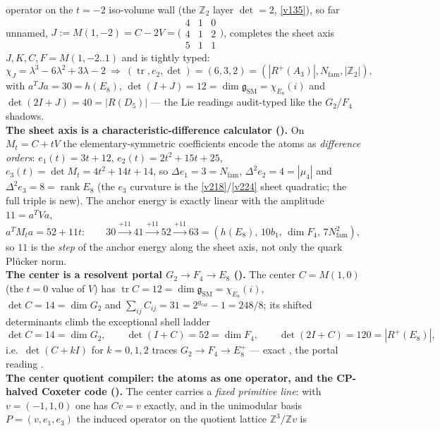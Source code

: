 \documentclass[11pt,a4paper]{article}
\newcommand{\gcar}{g_{\mathrm{car}}}
\newcommand{\Nfam}{N_{\mathrm{fam}}}
\newcommand{\Z}{\mathbb{Z}}
\theoremstyle{definition}
\begin{document}
\begin{keybox}
operator on the $t{=}{-}2$ iso-volume wall (the $\Z_2$ layer $\det{=}2$, \vref{v135}), so far unnamed,
$J:=M(1,{-}2)=C-2V=\big(\begin{smallmatrix}4&1&0\\4&1&2\\5&1&1\end{smallmatrix}\big)$, completes the sheet
axis $J,K,C,F=M(1,{-}2..1)$ and is tightly typed:
\[
  \chi_J=\lambda^3-6\lambda^2+3\lambda-2\ \Rightarrow\ (\operatorname{tr},e_2,\det)=(6,3,2)
  =(|R^+(A_3)|,\Nfam,|\Z_2|),
\]
with $a^TJa=30=h(E_8)$, $\det(I{+}J)=12=\dim\mathfrak g_{\mathrm{SM}}=\chi_{E_8}(i)$ and
$\det(2I{+}J)=40=|R(D_5)|$ --- the Lie readings audit-typed like the $G_2/F_4$ shadows.
\smallskip\\
\noindent\textbf{The sheet axis is a characteristic-difference calculator
().} On $M_t=C+tV$ the elementary-symmetric coefficients
encode the atoms as \emph{difference orders}: $e_1(t)=3t{+}12$, $e_2(t)=2t^2{+}15t{+}25$,
$e_3(t)=\det M_t=4t^2{+}14t{+}14$, so $\Delta e_1=3=\Nfam$, $\Delta^2 e_2=4=|\mu_4|$ and
$\Delta^2 e_3=8=\operatorname{rank}E_8$ (the $e_3$ curvature is the \vref{v218}/\vref{v224} sheet
quadratic; the full triple is new). The anchor energy is exactly linear with the amplitude $11=a^TVa$,
\[
  a^TM_t a=52+11t:\qquad 30\xrightarrow{+11}41\xrightarrow{+11}52\xrightarrow{+11}63
  =(h(E_8),\,10b_1,\,\dim F_4,\,7\Nfam^2),
\]
so $11$ is the \emph{step} of the anchor energy along the sheet axis, not only the quark Pl\"ucker norm.
\smallskip\\
\noindent\textbf{The center is a resolvent portal $G_2\!\to\!F_4\!\to\!E_8$
().} The center $C=M(1,0)$ (the $t{=}0$ value of $V$) has
$\operatorname{tr}C=12=\dim\mathfrak g_{\mathrm{SM}}=\chi_{E_8}(i)$, $\det C=14=\dim G_2$ and
$\sum_{ij}C_{ij}=31=2^{\gcar}{-}1=248/8$; its shifted determinants climb the exceptional shell ladder
\[
  \det C=14=\dim G_2,\qquad \det(I{+}C)=52=\dim F_4,\qquad \det(2I{+}C)=120=|R^+(E_8)|,
\]
i.e.\ $\det(C{+}kI)$ for $k=0,1,2$ traces $G_2\!\to\!F_4\!\to\!E_8^+$ --- exact \mE, the portal reading \mC.
\smallskip\\
\noindent\textbf{The center quotient compiler: the atoms as one operator, and the CP-halved Coxeter code
().} The center carries a \emph{fixed primitive line}: with
$v=(-1,1,0)$ one has $Cv=v$ exactly, and in the unimodular basis $P=(v,e_1,e_3)$ the induced operator on
the quotient lattice $\Z^3/\Z v$ is

\end{keybox}
\end{document}
